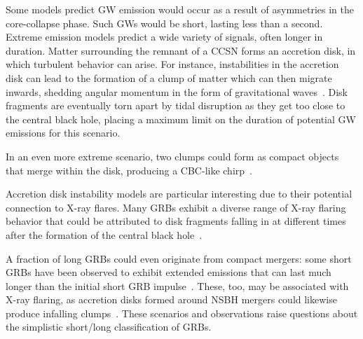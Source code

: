 Some models predict GW emission would occur as a result of asymmetries in the core-collapse phase.
Such \acp{GW} would be short, lasting less than a second.
Extreme emission models predict a wide variety of signals, often longer in duration.
Matter surrounding the remnant of a \ac{CCSN} forms an accretion disk, in which turbulent behavior can arise.
For instance, instabilities in the accretion disk can lead to the formation of a clump of matter which can then migrate inwards, shedding angular momentum in the form of gravitational waves~\citep{Piro_2007}.
Disk fragments are eventually torn apart by tidal disruption as they get too close to the central black hole, placing a maximum limit on the duration of potential GW emissions for this scenario.

In an even more extreme scenario, two clumps could form as compact objects that merge within the disk, producing a CBC-like chirp~\citep{vanPutten_2001, vanPutten_2004}.

Accretion disk instability models are particular interesting due to their potential connection to X-ray flares.
Many GRBs exhibit a diverse range of X-ray flaring behavior that could be attributed to disk fragments falling in at different times after the formation of the central black hole~\citep{Dallosso_2017}.

A fraction of long GRBs could even originate from compact mergers: some short GRBs have been observed to exhibit extended emissions that can last much longer than the initial short GRB impulse~\citep{Norris_2006, vanPutten_2014}.
These, too, may be associated with X-ray flaring, as accretion disks formed around NSBH mergers could likewise produce infalling clumps~\citep{Mu_2018}.
These scenarios and observations raise questions about the simplistic short/long classification of GRBs.
